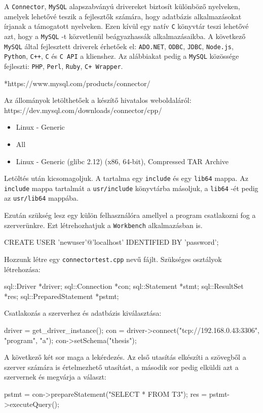 
A \texttt{Connector}, \texttt{MySQL} alapszabványú drivereket biztosít különböző nyelveken, amelyek lehetővé teszik a fejlesztők számára, hogy adatbázis alkalmazásokat írjanak a támogatott nyelveken. Ezen kívül egy natív \texttt{C} könyvtár teszi lehetővé azt, hogy a \texttt{MySQL} -t közvetlenül beágyazhassák alkalmazásaikba. \newline
A következő \texttt{MySQL} által fejlesztett driverek érhetőek el: \newline
\texttt{ADO.NET}, \texttt{ODBC}, \texttt{JDBC}, \texttt{Node.js}, \texttt{Python}, \texttt{C++}, \texttt{C} és \texttt{C API} a klienshez. \newline
Az alábbiakat pedig a \texttt{MySQL} közössége fejleszti:\newline
\texttt{PHP}, \texttt{Perl}, \texttt{Ruby}, \texttt{C+ Wrapper}.

*https://www.mysql.com/products/connector/


Az állományok letölthetőek a készítő hivatalos weboldaláról:\newline
https://dev.mysql.com/downloads/connector/cpp/
\begin{itemize}
\item Linux - Generic
\item All
\item Linux - Generic (glibc 2.12) (x86, 64-bit), Compressed TAR Archive
\end{itemize}
Letöltés után kicsomagoljuk. A tartalma egy \texttt{include} és egy \texttt{lib64} mappa. Az \texttt{include} mappa tartalmát a \texttt{usr/include} könyvtárba másoljuk, a \texttt{lib64} -ét pedig az \texttt{usr/lib64} mappába.

Ezután szükség lesz egy külön felhasználóra amellyel a program csatlakozni fog a szerverünkre. Ezt létrehozhatjuk a \texttt{Workbench} alkalmazásban is.
\begin{python}
CREATE USER 'newuser'@'localhost' IDENTIFIED BY 'password';
\end{python}

\newpage
{}

Hozzunk létre egy \texttt{connectortest.cpp} nevű fájlt.
Szükséges osztályok létrehozása:
\begin{cpp}
sql::Driver *driver;
sql::Connection *con;
sql::Statement *stmt;
sql::ResultSet *res;
sql::PreparedStatement *pstmt;
\end{cpp}
Csatlakozás a szerverhez és adatbázis kiválasztása:
\begin{cpp}
driver = get_driver_instance();
con = driver->connect("tcp://192.168.0.43:3306", "program", "a");
con->setSchema("thesis");
\end{cpp}
A következő két sor maga a lekérdezés. Az első utasítás elkészíti a szövegből a szerver számára is értelmezhető utasítást, a második sor pedig elküldi azt a szervernek és megvárja a választ:
\begin{cpp}
pstmt = con->prepareStatement("SELECT * FROM T3");
res = pstmt->executeQuery();
\end{cpp}

